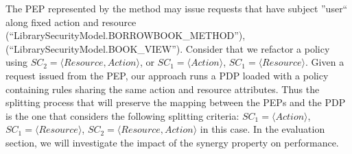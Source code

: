 The PEP represented by the method  may issue requests that have subject ''user`` along fixed action 
and resource (``LibrarySecurityModel.BORROWBOOK\_METHOD''), (``LibrarySecurityModel.BOOK\_VIEW'').
Consider that we refactor a policy using $SC_{2}=\langle Resource,Action\rangle$, or $SC_{1}=\langle Action\rangle$, $SC_{1}=\langle Resource\rangle$.
Given a request issued from the PEP, our approach runs a PDP loaded with a policy containing rules sharing the same action and resource attributes. 
Thus the splitting process that will preserve the mapping between the PEPs and the PDP is the one that considers the following splitting criteria: 
$SC_{1}=\langle Action\rangle$, $SC_{1}=\langle Resource\rangle$, $SC_{2}=\langle Resource,Action\rangle$ in this case.
In the evaluation section, we will investigate the impact of the synergy property on performance.


